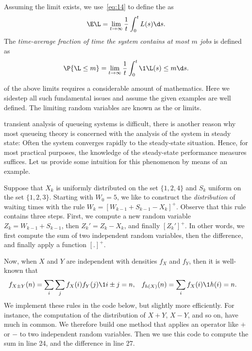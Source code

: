 Assuming the limit exists, we use~\cref{eq:14} to define the  as
\begin{equation} \label{eq:46}
 \E\L = \lim_{t\to\infty} \frac 1 t\int_0^t L(s) \d s.
\end{equation}
 The \emph{time-average fraction of time the system contains at most $m$ jobs} is defined as
\begin{equation*}
 \P{\L\leq m} =\lim_{t\to\infty} \frac 1 t\int_0^t \1{\L(s)\leq m} \d s.
\end{equation*}

 of the above limits requires a considerable amount of mathematics.
Here we sidestep all such fundamental issues and assume the given examples are well defined.
The limiting random variables are known as the  or  limits.

 transient analysis of queueing systems is difficult, there is another reason why most queueing theory is concerned with the analysis of the system in steady state: Often the system converges rapidly to the steady-state situation.
Hence, for most practical purposes, the knowledge of the steady-state performance measures suffices.
Let us provide some intuition for this phenomenon by means of an example.


Suppose that $X_k$ is uniformly distributed on the set $\{1,2,4\}$ and $S_k$ uniform on the set $\{1,2,3\}$.
Starting with $W_{0}=5$, we like to construct the \emph{distribution} of waiting times with the rule $W_{k}=[W_{k-1}+S_{k-1}-X_k]^+$.
Observe that this rule contains three steps.
First, we compute a new random variable $Z_k = W_{k-1} + S_{k-1}$, then  $Z_k' = Z_k - X_k$, and finally $[Z_k']^+$. 
In other words, we first compute the sum of two independent random variables, then the difference, and finally apply a function $[.]^+$. 

Now, when $X$ and $Y$ are independent with densities $f_X$ and $f_Y$, then it is well-known that 
\begin{align*}
f_{X\pm Y}(n) &= \sum_i \sum_j f_X(i) f_Y(j)\1{i\pm j = n}, & f_{h(X)}(n) &= \sum_{i} f_X(i)\1{h(i)=n}.
\end{align*}
We implement these rules in the code below, but slightly more efficiently.
For instance, the computation of the distribution of $X+Y$, $X-Y$, and so on, have much in common.
We therefore build one method  that applies an operator like $+$ or $-$ to two independent random variables.
Then we use this code to compute the sum in line 24, and the difference in line 27. 


